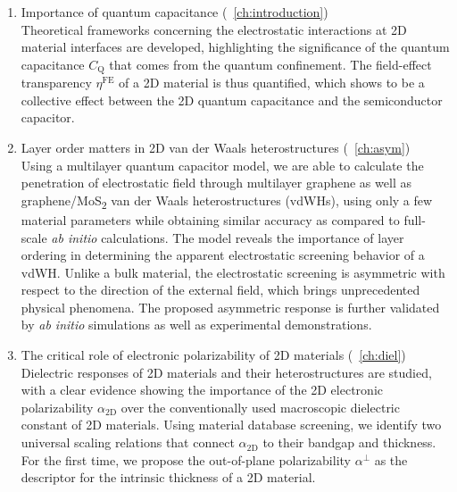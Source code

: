 \begin{enumerate}
\item Importance of quantum capacitance (~\autoref{ch:introduction})\\
  Theoretical frameworks concerning the electrostatic interactions at
  2D material interfaces are developed, highlighting the significance
  of the quantum capacitance $C_{\mathrm{Q}}$ that comes from the
  quantum confinement. The field-effect transparency
  $\eta^{\mathrm{FE}}$ of a 2D material is thus quantified, which
  shows to be a collective effect between the 2D quantum capacitance
  and the semiconductor capacitor.

  
\item Layer order matters in 2D van der Waals heterostructures (~\autoref{ch:asym})\\
  Using a multilayer quantum capacitor model, we are able to calculate
  the penetration of electrostatic field through multilayer graphene
  as well as graphene/MoS\textsubscript{2} van der Waals
  heterostructures (vdWHs), using only a few material parameters while
  obtaining similar accuracy as compared to full-scale \textit{ab
    initio} calculations. The model reveals the importance of layer
  ordering in determining the apparent electrostatic screening
  behavior of a vdWH. Unlike a bulk material, the electrostatic
  screening is asymmetric with respect to the direction of the
  external field, which brings unprecedented physical phenomena. The
  proposed asymmetric response is further validated by \textit{ab
    initio} simulations as well as experimental demonstrations.
  
\item The critical role of electronic polarizability of 2D materials
  (~\autoref{ch:diel})\\
  Dielectric responses of 2D materials and their heterostructures are
  studied, with a clear evidence showing the importance of the 2D
  electronic polarizability $\alpha_{\mathrm{2D}}$ over the
  conventionally used macroscopic dielectric constant of 2D
  materials. Using material database screening, we identify two
  universal scaling relations that connect $\alpha_{\mathrm{2D}}$ to
  their bandgap and thickness. For the first time, we propose the
  out-of-plane polarizability $\alpha^{\perp}$ as the descriptor for
  the intrinsic thickness of a 2D material.


\end{enumerate}
